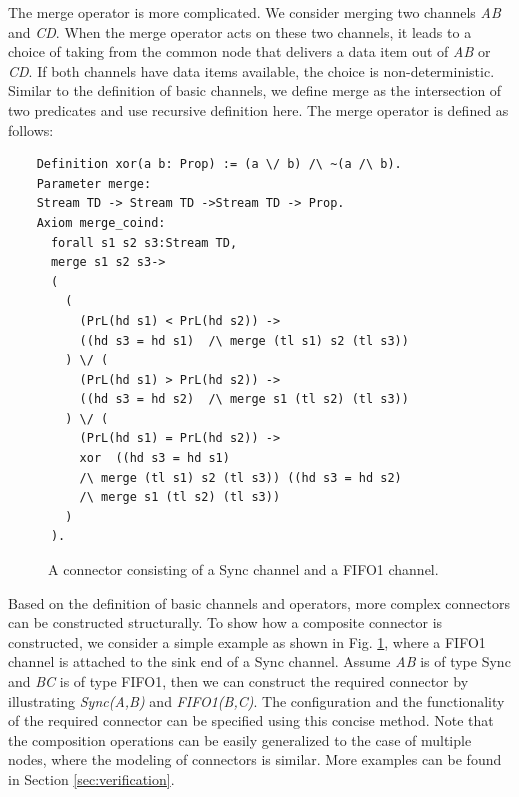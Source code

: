 \documentclass{llncs}
\begin{document}
The merge operator is more complicated. We consider merging two channels \emph{AB} and \emph{CD}. When the merge operator acts on these two channels, it leads to a choice of taking from the common node that delivers a data item out of \emph{AB} or \emph{CD}. If both channels have data items available, the choice is non-deterministic. Similar to the definition of basic channels, we define merge as the intersection of two predicates and use recursive definition here. The merge operator is defined as follows:
\begin{verbatim}
    Definition xor(a b: Prop) := (a \/ b) /\ ~(a /\ b).
    Parameter merge:
    Stream TD -> Stream TD ->Stream TD -> Prop.
    Axiom merge_coind:
      forall s1 s2 s3:Stream TD,
      merge s1 s2 s3->
      (
        (
          (PrL(hd s1) < PrL(hd s2)) ->
          ((hd s3 = hd s1)  /\ merge (tl s1) s2 (tl s3))
        ) \/ (
          (PrL(hd s1) > PrL(hd s2)) ->
          ((hd s3 = hd s2)  /\ merge s1 (tl s2) (tl s3))
        ) \/ (
          (PrL(hd s1) = PrL(hd s2)) ->
          xor  ((hd s3 = hd s1)  
          /\ merge (tl s1) s2 (tl s3)) ((hd s3 = hd s2)  
          /\ merge s1 (tl s2) (tl s3))  
        )  
      ).
\end{verbatim}

\begin{figure}
\vspace{0cm}
\centering
{}
\caption{A connector consisting of a Sync channel and a FIFO1 channel.}\label{fig:compsyncfifo}
\end{figure}

Based on the definition of basic channels and operators, more complex connectors can be constructed structurally.
To show how a composite connector is constructed, we consider a simple example as shown in Fig. \ref{fig:compsyncfifo}, where a FIFO1 channel is attached
to the sink end of a Sync channel. Assume \emph{AB} is of type Sync and \emph{BC} is of type FIFO1, then we can construct the required connector by
illustrating \emph{Sync(A,B)} and \emph{FIFO1(B,C)}. The configuration and the functionality of the required connector can be specified using this concise method. Note that the composition operations can be easily generalized to the case of multiple nodes, where the modeling of connectors is similar. More
examples can be found in Section \ref{sec:verification}.
\end{document}

